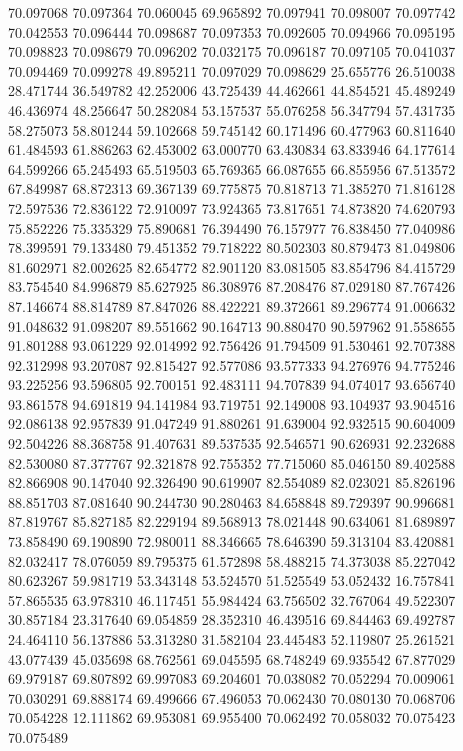70.097068
70.097364
70.060045
69.965892
70.097941
70.098007
70.097742
70.042553
70.096444
70.098687
70.097353
70.092605
70.094966
70.095195
70.098823
70.098679
70.096202
70.032175
70.096187
70.097105
70.041037
70.094469
70.099278
49.895211
70.097029
70.098629
25.655776
26.510038
28.471744
36.549782
42.252006
43.725439
44.462661
44.854521
45.489249
46.436974
48.256647
50.282084
53.157537
55.076258
56.347794
57.431735
58.275073
58.801244
59.102668
59.745142
60.171496
60.477963
60.811640
61.484593
61.886263
62.453002
63.000770
63.430834
63.833946
64.177614
64.599266
65.245493
65.519503
65.769365
66.087655
66.855956
67.513572
67.849987
68.872313
69.367139
69.775875
70.818713
71.385270
71.816128
72.597536
72.836122
72.910097
73.924365
73.817651
74.873820
74.620793
75.852226
75.335329
75.890681
76.394490
76.157977
76.838450
77.040986
78.399591
79.133480
79.451352
79.718222
80.502303
80.879473
81.049806
81.602971
82.002625
82.654772
82.901120
83.081505
83.854796
84.415729
83.754540
84.996879
85.627925
86.308976
87.208476
87.029180
87.767426
87.146674
88.814789
87.847026
88.422221
89.372661
89.296774
91.006632
91.048632
91.098207
89.551662
90.164713
90.880470
90.597962
91.558655
91.801288
93.061229
92.014992
92.756426
91.794509
91.530461
92.707388
92.312998
93.207087
92.815427
92.577086
93.577333
94.276976
94.775246
93.225256
93.596805
92.700151
92.483111
94.707839
94.074017
93.656740
93.861578
94.691819
94.141984
93.719751
92.149008
93.104937
93.904516
92.086138
92.957839
91.047249
91.880261
91.639004
92.932515
90.604009
92.504226
88.368758
91.407631
89.537535
92.546571
90.626931
92.232688
82.530080
87.377767
92.321878
92.755352
77.715060
85.046150
89.402588
82.866908
90.147040
92.326490
90.619907
82.554089
82.023021
85.826196
88.851703
87.081640
90.244730
90.280463
84.658848
89.729397
90.996681
87.819767
85.827185
82.229194
89.568913
78.021448
90.634061
81.689897
73.858490
69.190890
72.980011
88.346665
78.646390
59.313104
83.420881
82.032417
78.076059
89.795375
61.572898
58.488215
74.373038
85.227042
80.623267
59.981719
53.343148
53.524570
51.525549
53.052432
16.757841
57.865535
63.978310
46.117451
55.984424
63.756502
32.767064
49.522307
30.857184
23.317640
69.054859
28.352310
46.439516
69.844463
69.492787
24.464110
56.137886
53.313280
31.582104
23.445483
52.119807
25.261521
43.077439
45.035698
68.762561
69.045595
68.748249
69.935542
67.877029
69.979187
69.807892
69.997083
69.204601
70.038082
70.052294
70.009061
70.030291
69.888174
69.499666
67.496053
70.062430
70.080130
70.068706
70.054228
12.111862
69.953081
69.955400
70.062492
70.058032
70.075423
70.075489
